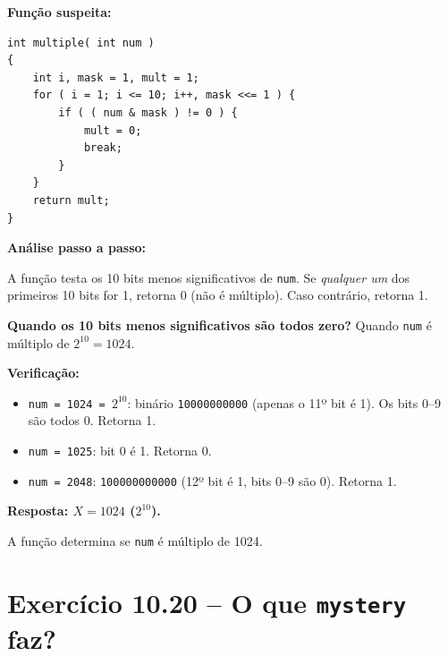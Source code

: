 \documentclass[12pt,a4paper]{article}
\begin{document}
\begin{respostabox}
\textbf{Função suspeita:}
\begin{lstlisting}
int multiple( int num )
{
    int i, mask = 1, mult = 1;
    for ( i = 1; i <= 10; i++, mask <<= 1 ) {
        if ( ( num & mask ) != 0 ) {
            mult = 0;
            break;
        }
    }
    return mult;
}
\end{lstlisting}

\textbf{Análise passo a passo:}

A função testa os 10 bits menos significativos de \texttt{num}. Se \textit{qualquer
um} dos primeiros 10 bits for 1, retorna 0 (não é múltiplo). Caso contrário, retorna 1.

\textbf{Quando os 10 bits menos significativos são todos zero?} Quando \texttt{num}
é múltiplo de $2^{10} = 1024$.

\textbf{Verificação:}
\begin{itemize}[noitemsep]
  \item \texttt{num = 1024 = $2^{10}$}: binário \texttt{10000000000} (apenas o
  11º bit é 1). Os bits 0--9 são todos 0. Retorna 1.
  \item \texttt{num = 1025}: bit 0 é 1. Retorna 0.
  \item \texttt{num = 2048}: \texttt{100000000000} (12º bit é 1, bits 0--9 são 0).
  Retorna 1.
\end{itemize}

\textbf{Resposta: $X = 1024$ ($2^{10}$).}

A função determina se \texttt{num} é múltiplo de 1024.
\end{respostabox}

\section{Exercício 10.20 -- O que \texttt{mystery} faz?}
\end{document}
